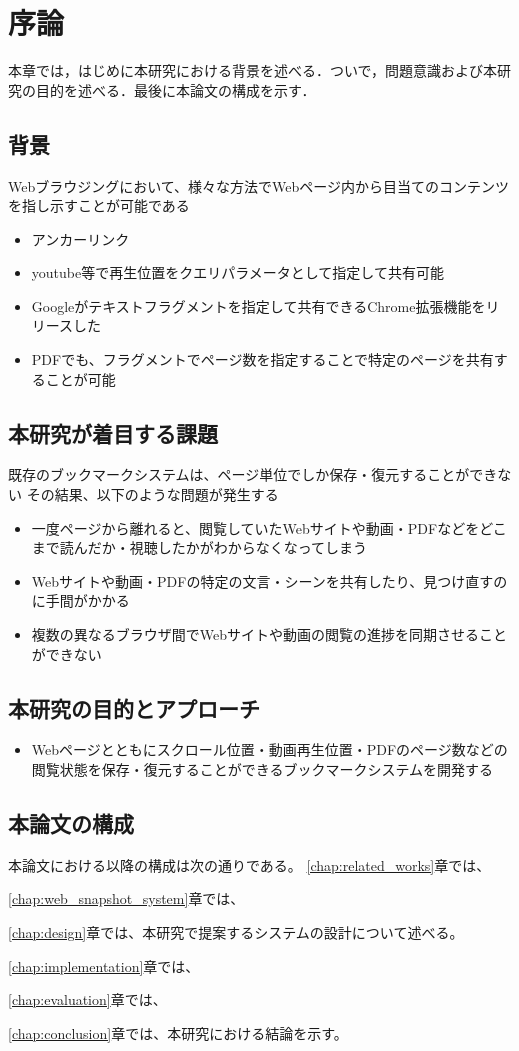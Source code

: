 \chapter{序論}
\label{chap:introduction}
本章では，はじめに本研究における背景を述べる．ついで，問題意識および本研究の目的を述べる．最後に本論文の構成を示す．

\section{背景}
\label{section:background}
Webブラウジングにおいて、様々な方法でWebページ内から目当てのコンテンツを指し示すことが可能である
\begin{itemize}
    \item アンカーリンク
    \item youtube等で再生位置をクエリパラメータとして指定して共有可能
    \item Googleがテキストフラグメントを指定して共有できるChrome拡張機能をリリースした
    \item PDFでも、フラグメントでページ数を指定することで特定のページを共有することが可能
\end{itemize}

\section{本研究が着目する課題}
既存のブックマークシステムは、ページ単位でしか保存・復元することができない
その結果、以下のような問題が発生する
\begin{itemize}
        \item 一度ページから離れると、閲覧していたWebサイトや動画・PDFなどをどこまで読んだか・視聴したかがわからなくなってしまう
        \item Webサイトや動画・PDFの特定の文言・シーンを共有したり、見つけ直すのに手間がかかる
        \item 複数の異なるブラウザ間でWebサイトや動画の閲覧の進捗を同期させることができない
\end{itemize}

\section{本研究の目的とアプローチ}
\begin{itemize}
      \item  Webページとともにスクロール位置・動画再生位置・PDFのページ数などの閲覧状態を保存・復元することができるブックマークシステムを開発する
\end{itemize}

\section{本論文の構成}

本論文における以降の構成は次の通りである。
\ref{chap:related_works}章では、

\ref{chap:web_snapshot_system}章では、

\ref{chap:design}章では、本研究で提案するシステムの設計について述べる。

\ref{chap:implementation}章では、

\ref{chap:evaluation}章では、

\ref{chap:conclusion}章では、本研究における結論を示す。